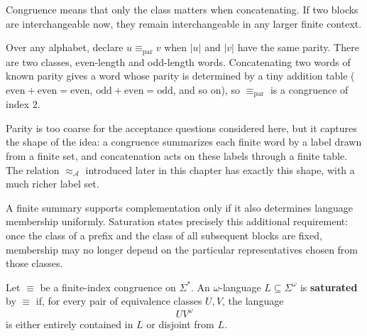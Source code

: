 Congruence means that only the class matters when concatenating.  If two
blocks are interchangeable now, they remain interchangeable in any
larger finite context.

\begin{example}
\label{ex:parity-congruence}
Over any alphabet, declare $u\equiv_{\mathrm{par}} v$ when $|u|$ and
$|v|$ have the same parity.  There are two classes, even-length and
odd-length words.  Concatenating two words of known parity gives a word
whose parity is determined by a tiny addition table
($\text{even}+\text{even}=\text{even}$,
$\text{odd}+\text{even}=\text{odd}$, and so on), so
$\equiv_{\mathrm{par}}$ is a congruence of index $2$.
\end{example}

Parity is too coarse for the acceptance questions considered here, but
it captures the shape of the idea: a congruence summarizes each finite
word by a label drawn from a finite set, and concatenation acts on these
labels through a finite table.  The relation $\approx_{\mathcal A}$
introduced later in this chapter has exactly this
shape, with a much richer label set.

A finite summary supports complementation only if it also determines
language membership uniformly.  Saturation states precisely this
additional requirement: once the class of a prefix and the class of all
subsequent blocks are fixed, membership may no longer depend on the
particular representatives chosen from those classes.

\begin{definition}[Saturation]
\label{def:saturation}
Let $\equiv$ be a finite-index congruence on $\Sigma^*$.  An
$\omega$-language $L\subseteq\Sigma^\omega$ is \textbf{saturated} by
$\equiv$ if, for every pair of equivalence classes $U,V$, the language
\[
  U V^\omega
\]
is either entirely contained in $L$ or disjoint from $L$.
\end{definition}

